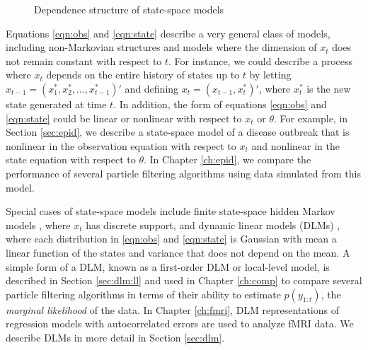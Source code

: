 \begin{figure}[ht]
\centering
\caption{Dependence structure of state-space models} \label{fig:ssdraw}
\end{figure}

Equations \eqref{eqn:obs} and \eqref{eqn:state} describe a very general class of models, including non-Markovian structures and models where the dimension of $x_t$ does not remain constant with respect to $t$. For instance, we could describe a process where $x_t$ depends on the entire history of states up to $t$ by letting $x_{t-1} = (x^*_1, x^*_2, \ldots, x^*_{t-1})'$ and defining $x_t = (x_{t-1}, x^*_t)'$, where $x^*_t$ is the new state generated at time $t$. In addition, the form of equations \eqref{eqn:obs} and \eqref{eqn:state} could be linear or nonlinear with respect to $x_t$ or $\theta$. For example, in Section \ref{sec:epid}, we describe a state-space model of a disease outbreak that is nonlinear in the observation equation with respect to $x_t$ and nonlinear in the state equation with respect to $\theta$. In Chapter \ref{ch:epid}, we compare the performance of several particle filtering algorithms using data simulated from this model.

Special cases of state-space models include finite state-space hidden Markov models \citep{cappe:2005:inference}, where $x_t$ has discrete support, and dynamic linear models (DLMs) \citep{West:Harr:baye:1997, petris:camp:2009:dynamic}, where each distribution in \eqref{eqn:obs} and \eqref{eqn:state} is Gaussian with mean a linear function of the states and variance that does not depend on the mean. A simple form of a DLM, known as a first-order DLM or local-level model, is described in Section \ref{sec:dlm:ll} and used in Chapter \ref{ch:comp} to compare several particle filtering algorithms in terms of their ability to estimate $p(y_{1:t})$, the \emph{marginal likelihood} of the data. In Chapter \ref{ch:fmri}, DLM representations of regression models with autocorrelated errors are used to analyze fMRI data. We describe DLMs in more detail in Section \ref{sec:dlm}.


